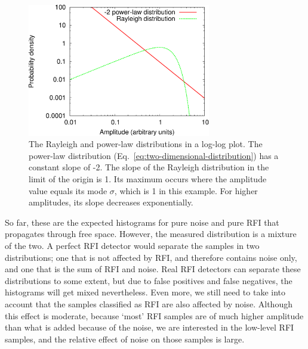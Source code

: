\documentclass[useAMS,usenatbib]{mn2e}
\begin{document}
\begin{figure}
\begin{center}\hspace{-5mm}\includegraphics[width=8cm]{img/plot-rayleigh-and-rfi-trimmed}
\caption{The Rayleigh and power-law distributions in a log-log plot. The power-law distribution (Eq.~\eqref{eq:two-dimensional-distribution}) has a constant slope of -2. The slope of the Rayleigh distribution in the limit of the origin is 1. Its maximum occurs where the amplitude value equals its mode $\sigma$, which is 1 in this example. For higher amplitudes, its slope decreases exponentially.}
\label{fig:rayleigh-and-rfi-distributions}
\end{center}
\end{figure}

So far, these are the expected histograms for pure noise and pure RFI that propagates through free space. However, the measured distribution is a mixture of the two. A perfect RFI detector would separate the samples in two distributions; one that is not affected by RFI, and therefore contains noise only, and one that is the sum of RFI and noise. Real RFI detectors can separate these distributions to some extent, but due to false positives and false negatives, the histograms will get mixed nevertheless. Even more, we still need to take into account that the samples classified as RFI are also affected by noise. Although this effect is moderate, because `most' RFI samples are of much higher amplitude than what is added because of the noise, we are interested in the low-level RFI samples, and the relative effect of noise on those samples is large.
\end{document}

